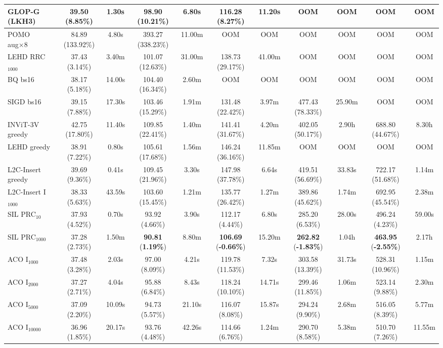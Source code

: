 \documentclass[sigconf]{acmart}
\begin{document}
\begin{table}[t]
{\begin{tabular}{lcccccccccc}
GLOP-G (LKH3) & 39.50 (8.85\%) & 1.30s & 98.90 (10.21\%) & 6.80s & 116.28 (8.27\%) & 11.20s & OOM & OOM & OOM & OOM \\
\midrule
POMO aug×8 & 84.89 (133.92\%) & 4.80s & 393.27 (338.23\%) & 11.00m & OOM & OOM & OOM & OOM & OOM & OOM \\
LEHD RRC$_{1000}$ & 37.43 (3.14\%) & 3.40m & 101.07 (12.63\%) & 31.00m & 138.73 (29.17\%) & 41.00m & OOM & OOM & OOM & OOM \\
BQ bs16 & 38.17 (5.18\%) & 14.00s & 104.40 (16.34\%) & 2.60m & OOM & OOM & OOM & OOM & OOM & OOM \\
SIGD bs16 & 39.15 (7.88\%) & 17.30s & 103.46 (15.29\%) & 1.91m & 131.48 (22.42\%) & 3.97m & 477.43 (78.33\%) & 25.90m & OOM & OOM \\
INViT-3V greedy & 42.75 (17.80\%) & 11.40s & 109.85 (22.41\%) & 1.40m & 141.41 (31.67\%) & 4.20m & 402.05 (50.17\%) & 2.90h & 688.80 (44.67\%) & 8.30h \\
LEHD greedy & 38.91 (7.22\%) & 0.80s & 105.61 (17.68\%) & 1.56m & 146.24 (36.16\%) & 11.85m & OOM & OOM & OOM & OOM \\
L2C-Insert greedy & 39.69 (9.36\%) & 0.41s & 109.45 (21.96\%) & 3.30s & 147.98 (37.78\%) & 6.64s & 419.51 (56.69\%) & 33.83s & 722.17 (51.68\%) & 1.14m \\
L2C-Insert I$_{1000}$ & 38.33 (5.63\%) & 43.59s & 103.60 (15.45\%) & 1.21m & 135.77 (26.42\%) & 1.27m & 389.86 (45.62\%) & 1.74m & 692.95 (45.54\%) & 2.38m \\
SIL PRC$_{10}$ & 37.93 (4.52\%) & 0.70s & 93.92 (4.66\%) & 3.90s & 112.17 (4.44\%) & 6.80s & 285.20 (6.53\%) & 28.00s & 496.24 (4.23\%) & 59.00s \\
SIL PRC$_{1000}$ & 37.28 (2.73\%) & 1.50m & \textbf{90.81} (\textbf{1.19\%}) & 8.80m & \textbf{106.69} (\textbf{-0.66\%}) & 15.20m & \textbf{262.82} (\textbf{-1.83\%}) & 1.04h & \textbf{463.95} (\textbf{-2.55\%}) & 2.17h \\
\midrule
ACO I$_{1000}$ & 37.48 (3.28\%) & 2.03s & 97.00 (8.09\%) & 4.21s & 119.78 (11.53\%) & 7.32s & 303.58 (13.39\%) & 31.73s & 528.31 (10.96\%) & 1.15m \\
ACO I$_{2000}$ & 37.27 (2.71\%) & 4.04s & 95.88 (6.84\%) & 8.43s & 118.24 (10.10\%) & 14.71s & 299.46 (11.85\%) & 1.06m & 523.14 (9.88\%) & 2.30m \\
ACO I$_{5000}$ & 37.09 (2.20\%) & 10.09s & 94.73 (5.57\%) & 21.10s & 116.07 (8.08\%) & 15.87s & 294.24 (9.90\%) & 2.68m & 516.05 (8.39\%) & 5.77m \\
ACO I$_{10000}$ & 36.96 (1.85\%) & 20.17s & 93.76 (4.48\%) & 42.26s & 114.66 (6.76\%) & 1.24m & 290.70 (8.58\%) & 5.38m & 510.70 (7.26\%) & 11.55m \\

\end{tabular}}
\end{table}
\end{document}
